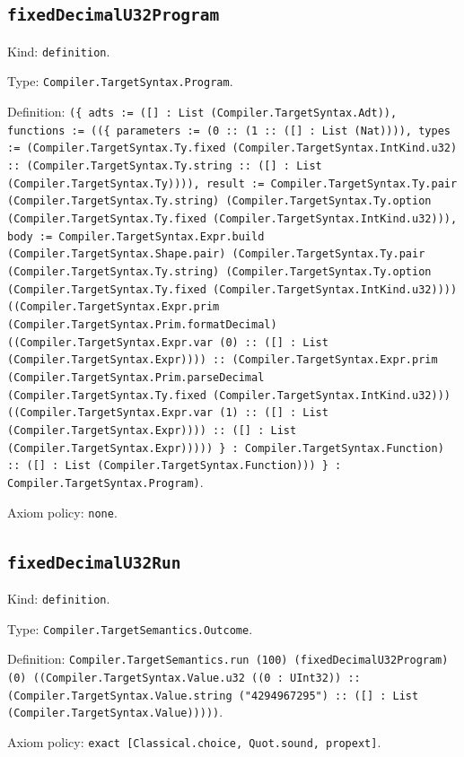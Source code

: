 \documentclass[11pt]{article}
\begin{document}
\subsection*{\texttt{fixedDecimalU32Program}}
\noindent Kind: \texttt{definition}.\par
\noindent Type: \texttt{Compiler.TargetSyntax.Program}.\par
\noindent Definition: \texttt{(\{ adts := ([] : List (Compiler.TargetSyntax.Adt)), functions := ((\{ parameters := (0 :: (1 :: ([] : List (Nat)))), types := (Compiler.TargetSyntax.Ty.fixed (Compiler.TargetSyntax.IntKind.u32) :: (Compiler.TargetSyntax.Ty.string :: ([] : List (Compiler.TargetSyntax.Ty)))), result := Compiler.TargetSyntax.Ty.pair (Compiler.TargetSyntax.Ty.string) (Compiler.TargetSyntax.Ty.option (Compiler.TargetSyntax.Ty.fixed (Compiler.TargetSyntax.IntKind.u32))), body := Compiler.TargetSyntax.Expr.build (Compiler.TargetSyntax.Shape.pair) (Compiler.TargetSyntax.Ty.pair (Compiler.TargetSyntax.Ty.string) (Compiler.TargetSyntax.Ty.option (Compiler.TargetSyntax.Ty.fixed (Compiler.TargetSyntax.IntKind.u32)))) ((Compiler.TargetSyntax.Expr.prim (Compiler.TargetSyntax.Prim.formatDecimal) ((Compiler.TargetSyntax.Expr.var (0) :: ([] : List (Compiler.TargetSyntax.Expr)))) :: (Compiler.TargetSyntax.Expr.prim (Compiler.TargetSyntax.Prim.parseDecimal (Compiler.TargetSyntax.Ty.fixed (Compiler.TargetSyntax.IntKind.u32))) ((Compiler.TargetSyntax.Expr.var (1) :: ([] : List (Compiler.TargetSyntax.Expr)))) :: ([] : List (Compiler.TargetSyntax.Expr))))) \} : Compiler.TargetSyntax.Function) :: ([] : List (Compiler.TargetSyntax.Function))) \} : Compiler.TargetSyntax.Program)}.\par
\noindent Axiom policy: \texttt{none}.\par
\subsection*{\texttt{fixedDecimalU32Run}}
\noindent Kind: \texttt{definition}.\par
\noindent Type: \texttt{Compiler.TargetSemantics.Outcome}.\par
\noindent Definition: \texttt{Compiler.TargetSemantics.run (100) (fixedDecimalU32Program) (0) ((Compiler.TargetSyntax.Value.u32 ((0 : UInt32)) :: (Compiler.TargetSyntax.Value.string ("4294967295") :: ([] : List (Compiler.TargetSyntax.Value)))))}.\par
\noindent Axiom policy: \texttt{exact [Classical.choice, Quot.sound, propext]}.\par
\end{document}
